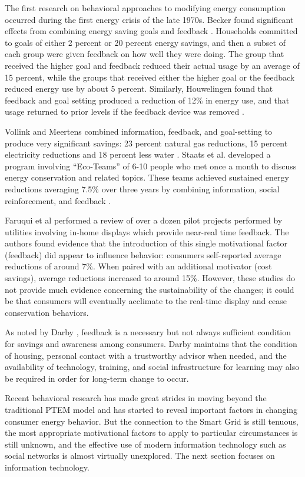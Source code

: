 The first research on behavioral approaches to modifying energy consumption
occurred during the first energy crisis of the late 1970s. Becker found
significant effects from combining energy saving goals and feedback
\cite{Becker78} .  Households committed to goals of either 2 percent or 20
percent energy savings, and then a subset of each group were given feedback
on how well they were doing. The group that received the higher goal and
feedback reduced their actual usage by an average of 15 percent, while the
groups that received either the higher goal or the feedback reduced energy
use by about 5 percent.  Similarly, Houwelingen found that feedback and
goal setting produced a reduction of 12\% in energy use, and that usage
returned to prior levels if the feedback device was removed
\cite{Houwelingen89}.

Vollink and Meertens combined information, feedback, and goal-setting to
produce very significant savings: 23 percent natural gas reductions, 15
percent electricity reductions and 18 percent less water \cite{Vollink99}.
Staats et al. developed a program involving ``Eco-Teams'' of 6-10 people
who met once a month to discuss energy conservation and related
topics. These teams achieved sustained energy reductions averaging 7.5\% over
three years by combining information, social reinforcement, and feedback
\cite{Staats04}.

Faruqui et al \cite{Faruqui09} performed a review of over a dozen pilot projects
performed by utilities involving in-home displays which provide near-real
time feedback.  The authors found evidence that the introduction of this
single motivational factor (feedback) did appear to influence behavior:
consumers self-reported average reductions of around 7\%.   When paired with an
additional motivator (cost savings), average reductions increased to around
15\%.  However, these studies do not provide much evidence concerning the
sustainability of the changes; it could be that consumers will eventually
acclimate to the real-time display and cease conservation behaviors. 

As noted by Darby \cite{Darby06}, feedback is a necessary but
not always sufficient condition for savings and awareness among
consumers. Darby maintains that  the condition of housing, personal contact
with a trustworthy advisor when needed, and the availability of technology, 
training, and social infrastructure for learning may also be required 
in order for long-term change to occur.  

Recent behavioral research  has made great strides in moving beyond the
traditional PTEM model and has started to reveal important factors in
changing consumer energy behavior. But the connection to the Smart Grid is
still tenuous, the most appropriate motivational factors to apply to
particular circumstances is still unknown, and the effective use of modern
information technology such as social networks is almost virtually
unexplored.   The next section focuses on information technology. 

